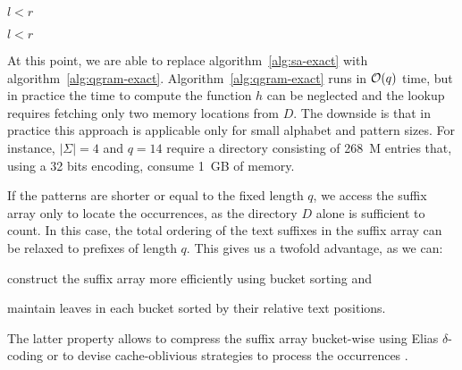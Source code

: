 \begin{algorithm}[h!]
\begin{minipage}[t]{.5\textwidth}
\label{alg:qgram-godown}
\begin{algorithmic}[1]
		\State \Return \False
	\EndIf
	\EndWhile
	\State \Return $l < r$
\EndProcedure
\end{algorithmic}
\end{minipage}
\begin{minipage}[t]{.5\textwidth}
\label{alg:qgram-goright}
\begin{algorithmic}[1]
		\State \Return \False
	\EndIf
	\Repeat
	\Until {}
	\State \Return $l < r$
\EndProcedure
\end{algorithmic}
\end{minipage}
\end{algorithm}

At this point, we are able to replace algorithm~\ref{alg:sa-exact} with algorithm~\ref{alg:qgram-exact}.
Algorithm~\ref{alg:qgram-exact} runs in $\mathcal{O}(q)$ time, but in practice the time to compute the function $h$ can be neglected and the lookup requires fetching only two memory locations from $D$.
The downside is that in practice this approach is applicable only for small alphabet and pattern sizes.
For instance, $|\Sigma| = 4$ and $q=14$ require a directory consisting of 268~M entries that, using a 32 bits encoding, consume 1~GB of memory.

If the patterns are shorter or equal to the fixed length $q$, we access the suffix array only to locate the occurrences, as the directory $D$ alone is sufficient to count.
In this case, the total ordering of the text suffixes in the suffix array can be relaxed to prefixes of length $q$.
This gives us a twofold advantage, as we can:
\begin{inparaenum}[(i)]
\item construct the suffix array more efficiently using bucket sorting and
\item maintain leaves in each bucket sorted by their relative text positions.
\end{inparaenum}
The latter property allows to compress the suffix array bucket-wise \eg using Elias $\delta$-coding \citep{?} or to devise cache-oblivious strategies to process the occurrences \citep{?}.

